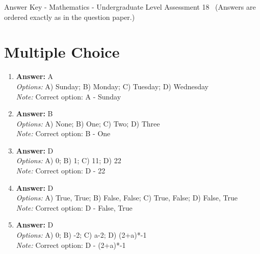 \documentclass[12pt]{article}
\begin{document}
\begin{center}
Answer Key - Mathematics - Undergraduate Level Assessment 18 \
\small (Answers are ordered exactly as in the question paper.)
\end{center}

\section*{Multiple Choice}
\begin{enumerate}[label=\arabic*.]
\item \textbf{Answer:} A
\\ \textit{Options:} A) Sunday; B) Monday; C) Tuesday; D) Wednesday
\\ \textit{Note:} Correct option: A - Sunday
\item \textbf{Answer:} B
\\ \textit{Options:} A) None; B) One; C) Two; D) Three
\\ \textit{Note:} Correct option: B - One
\item \textbf{Answer:} D
\\ \textit{Options:} A) 0; B) 1; C) 11; D) 22
\\ \textit{Note:} Correct option: D - 22
\item \textbf{Answer:} D
\\ \textit{Options:} A) True, True; B) False, False; C) True, False; D) False, True
\\ \textit{Note:} Correct option: D - False, True
\item \textbf{Answer:} D
\\ \textit{Options:} A) 0; B) -2; C) a-2; D) (2+a)*-1
\\ \textit{Note:} Correct option: D - (2+a)*-1
\end{enumerate}
\end{document}
